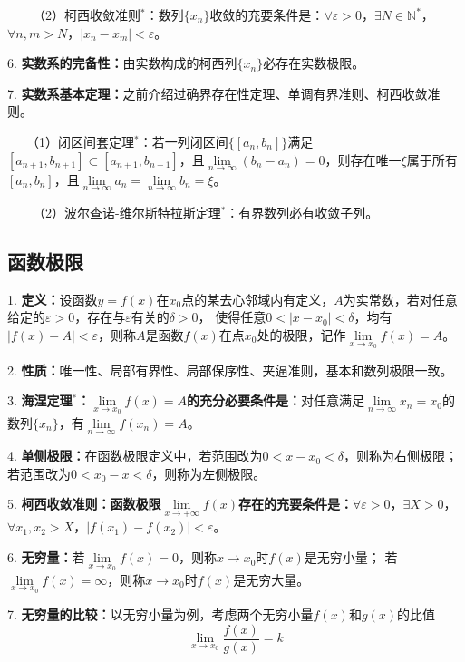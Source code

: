 ~~~~（2）柯西收敛准则$^*$：数列$\{x_n\}$收敛的充要条件是：$\forall \varepsilon>0$，$\exists N\in \mathbb{N}^*$，$\forall n,m>N$，$\left|x_n-x_m\right|<\varepsilon$。

6. \textbf{实数系的完备性：}由实数构成的柯西列$\{x_n\}$必存在实数极限。

7. \textbf{实数系基本定理：}之前介绍过确界存在性定理、单调有界准则、柯西收敛准则。

~~~（1）闭区间套定理$^*$：若一列闭区间$\{\left[a_n,b_n\right]\}$满足$\left[a_{n+1},b_{n+1}\right]\subset \left[a_{n+1},b_{n+1}\right]$，且$\lim\limits_{n\rightarrow \infty}\left(b_n-a_n\right)=0$，则存在唯一$\xi$属于所有$\left[a_n,b_n\right]$，且$\lim\limits_{n\rightarrow \infty}a_n=\lim\limits_{n\rightarrow \infty}b_n=\xi$。

~~~~（2）波尔查诺-维尔斯特拉斯定理$^*$：有界数列必有收敛子列。

\subsection{函数极限}

1. \textbf{定义：}设函数$y=f(x)$在$x_0$点的某去心邻域内有定义，$A$为实常数，若对任意给定的$\varepsilon>0$，存在与$\varepsilon$有关的$\delta>0$，
使得任意$0<\left|x-x_0\right|<\delta$，均有$|f(x)-A|<\varepsilon$，则称$A$是函数$f(x)$在点$x_0$处的极限，记作$\lim\limits_{x\rightarrow x_0}f(x)=A$。

2. \textbf{性质：}唯一性、局部有界性、局部保序性、夹逼准则，基本和数列极限一致。

3. \textbf{海涅定理$^*$：$\lim\limits_{x\rightarrow x_0}f(x)=A$的充分必要条件是：}对任意满足$\lim\limits_{n \rightarrow \infty}x_n=x_0$的数列$\{x_n\}$，有$\lim\limits_{n \rightarrow \infty}f\left(x_n\right)=A$。

4. \textbf{单侧极限：}在函数极限定义中，若范围改为$0<x-x_0<\delta$，则称为右侧极限；若范围改为$0<x_0-x<\delta$，则称为左侧极限。

5. \textbf{柯西收敛准则：函数极限$\lim\limits_{x\rightarrow +\infty} f(x)$存在的充要条件是：}$\forall \varepsilon>0$，$\exists X>0$，$\forall x_1,x_2>X$，$\left|f(x_1)-f(x_2)\right|<\varepsilon$。

6. \textbf{无穷量：}若$\lim\limits_{x\rightarrow x_0}f(x)=0$，则称$x\rightarrow x_0$时$f(x)$是无穷小量；
若$\lim\limits_{x\rightarrow x_0}f(x)=\infty$，则称$x\rightarrow x_0$时$f(x)$是无穷大量。

7. \textbf{无穷量的比较：}以无穷小量为例，考虑两个无穷小量$f(x)$和$g(x)$的比值
\begin{equation*}
    \lim\limits_{x\rightarrow x_0}\frac{f(x)}{g(x)}=k
\end{equation*}

